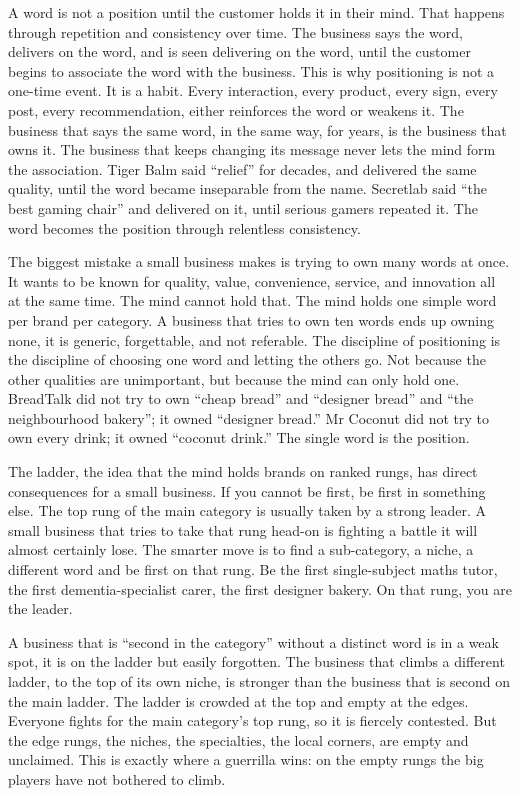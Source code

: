 \documentclass[10pt,twoside,openany]{memoir}
\begin{document}
{A word is not a position until the customer holds it in their mind. That
happens through repetition and consistency over time. The business says
the word, delivers on the word, and is seen delivering on the word,
until the customer begins to associate the word with the business. This
is why positioning is not a one-time event. It is a habit. Every
interaction, every product, every sign, every post, every
recommendation, either reinforces the word or weakens it. The business
that says the same word, in the same way, for years, is the business
that owns it. The business that keeps changing its message never lets
the mind form the association. Tiger Balm said ``relief'' for decades,
and delivered the same quality, until the word became inseparable from
the name. Secretlab said ``the best gaming chair'' and delivered on it,
until serious gamers repeated it. The word becomes the position through
relentless consistency.

The biggest mistake a small business makes is trying to own many words
at once. It wants to be known for quality, value, convenience, service,
and innovation all at the same time. The mind cannot hold that. The mind
holds one simple word per brand per category. A business that tries to
own ten words ends up owning none, it is generic, forgettable, and not
referable. The discipline of positioning is the discipline of choosing
one word and letting the others go. Not because the other qualities are
unimportant, but because the mind can only hold one. BreadTalk did not
try to own ``cheap bread'' and ``designer bread'' and ``the
neighbourhood bakery''; it owned ``designer bread.'' Mr Coconut did not
try to own every drink; it owned ``coconut drink.'' The single word is
the position.

The ladder, the idea that the mind holds brands on ranked rungs, has
direct consequences for a small business. If you cannot be first, be
first in something else. The top rung of the main category is usually
taken by a strong leader. A small business that tries to take that rung
head-on is fighting a battle it will almost certainly lose. The smarter
move is to find a sub-category, a niche, a different word and be first
on that rung. Be the first single-subject maths tutor, the first
dementia-specialist carer, the first designer bakery. On that rung, you
are the leader.

A business that is ``second in the category'' without a distinct word is
in a weak spot, it is on the ladder but easily forgotten. The business
that climbs a different ladder, to the top of its own niche, is stronger
than the business that is second on the main ladder. The ladder is
crowded at the top and empty at the edges. Everyone fights for the main
category's top rung, so it is fiercely contested. But the edge rungs,
the niches, the specialties, the local corners, are empty and unclaimed.
This is exactly where a guerrilla wins: on the empty rungs the big
players have not bothered to climb.

}
\end{document}

